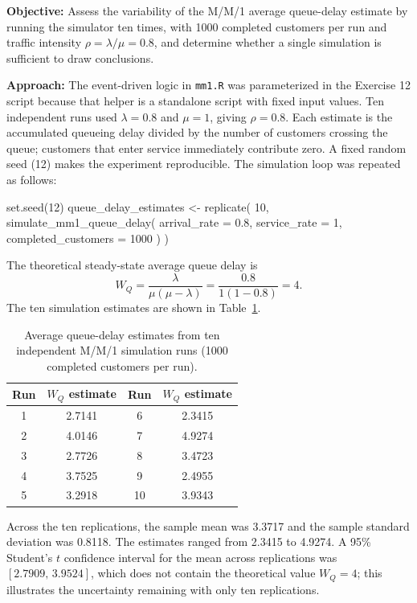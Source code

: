 \documentclass[12pt]{article}
\begin{document}
\textbf{Objective:} Assess the variability of the M/M/1 average queue-delay estimate by running the simulator ten times, with 1000 completed customers per run and traffic intensity $\rho=\lambda/\mu=0.8$, and determine whether a single simulation is sufficient to draw conclusions.

\textbf{Approach:} The event-driven logic in \texttt{mm1.R} was parameterized in the Exercise 12 script because that helper is a standalone script with fixed input values. Ten independent runs used $\lambda=0.8$ and $\mu=1$, giving $\rho=0.8$. Each estimate is the accumulated queueing delay divided by the number of customers crossing the queue; customers that enter service immediately contribute zero. A fixed random seed (12) makes the experiment reproducible. The simulation loop was repeated as follows:

\begin{configbox}
set.seed(12)
queue_delay_estimates <- replicate(
    10,
    simulate_mm1_queue_delay(
        arrival_rate = 0.8,
        service_rate = 1,
        completed_customers = 1000
    )
)
\end{configbox}

The theoretical steady-state average queue delay is
\[
W_Q = \frac{\lambda}{\mu(\mu-\lambda)}
        = \frac{0.8}{1(1-0.8)} = 4.
\]
The ten simulation estimates are shown in Table~\ref{tab:ex12_runs}.

\begin{table}[H]
\centering
\begin{tabular}{|c|c||c|c|}
\hline
Run & $W_Q$ estimate & Run & $W_Q$ estimate \\
\hline
1 & 2.7141 & 6 & 2.3415 \\
2 & 4.0146 & 7 & 4.9274 \\
3 & 2.7726 & 8 & 3.4723 \\
4 & 3.7525 & 9 & 2.4955 \\
5 & 3.2918 & 10 & 3.9343 \\
\hline
\end{tabular}
\caption{Average queue-delay estimates from ten independent M/M/1 simulation runs (1000 completed customers per run).}
\label{tab:ex12_runs}
\end{table}

Across the ten replications, the sample mean was 3.3717 and the sample standard deviation was 0.8118. The estimates ranged from 2.3415 to 4.9274. A 95\% Student's $t$ confidence interval for the mean across replications was $[2.7909,\,3.9524]$, which does not contain the theoretical value $W_Q=4$; this illustrates the uncertainty remaining with only ten replications.
\end{document}
